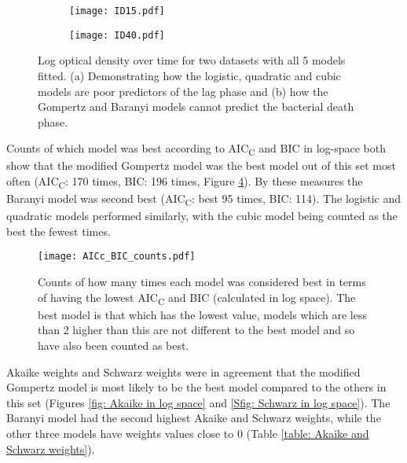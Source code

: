 \documentclass[11pt]{article}
\begin{document}
\begin{linenumbers}
        \begin{figure}
            \centering
            \begin{subfigure}[a]{0.45\textwidth}
                \centering
                \texttt{[image: ID15.pdf]}
                \caption{}
                \label{fig: growth plot lag}
            \end{subfigure}
            \hfill
            \begin{subfigure}[a]{0.45\textwidth}
                \centering
                \texttt{[image: ID40.pdf]}
                \caption{}
                \label{fig:growth plot death}
            \end{subfigure}
            \caption{Log optical density over time for two datasets with all 5 models fitted. (a) Demonstrating how the logistic, quadratic and cubic models are poor predictors of the lag phase and (b) how the Gompertz and Baranyi models cannot predict the bacterial death phase.}
            \label{fig:both growth plots}
        \end{figure}
        
        Counts of which model was best according to AIC\textsubscript{C} and BIC in log-space both show that the modified Gompertz model was the best model out of this set most often (AIC\textsubscript{C}: 170 times, BIC: 196 times, Figure \ref{fig: counts in log space}). By these measures the Baranyi model was second best (AIC\textsubscript{C}: best 95 times, BIC: 114). The logistic and quadratic models performed similarly, with the cubic model being counted as the best the fewest times.
    
        \begin{figure}[ht!]
            \centering
            \texttt{[image: AICc\_BIC\_counts.pdf]}
            \caption{Counts of how many times each model was considered best in terms of having the lowest AIC\textsubscript{C} and BIC (calculated in log space). The best model is that which has the lowest value, models which are less than 2 higher than this are not different to the best model and so have also been counted as best.}
            \label{fig: counts in log space}
        \end{figure}
        
        Akaike weights and Schwarz weights were in agreement that the modified Gompertz model is most likely to be the best model compared to the others in this set (Figures \ref{fig: Akaike in log space} and \ref{Sfig: Schwarz in log space}). The Baranyi model had the second highest Akaike and Schwarz weights, while the other three models have weights values close to 0 (Table \ref{table: Akaike and Schwarz weights}).
        

\end{linenumbers}
\end{document}
